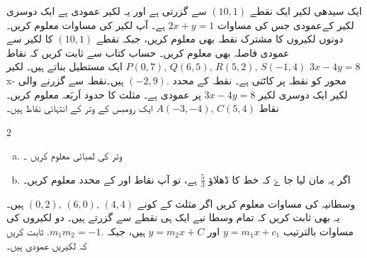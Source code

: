 ایک سیدھی لکیر   ایک نقطے \( (10,1) \)  سے گزرتی ہے اور یہ لکیر عمودی ہے ایک دوسری لکیر  کےعمودی جس کی مساوات \( 2x+y=1 \) ہے۔ آپ لکیر  کی مساوات معلوم کریں۔
دونوں لکیروں کا مشترک نقطہ بھی معلوم کریں، جبکہ نقطے \( (10,1) \)  کا لکیر  سے عمودی فاصلہ بھی معلوم کریں۔
حساب کتاب سے ثابت کریں کہ نقاط \( P(0,7), \, Q(6,5),\, R(5,2), \, S(-1,4) \) ایک مستطیل بناتے ہیں۔
لکیر \( 3x-4y=8 \) x- محور کو نقطہ  پر کاٹتی ہے۔ نقطہ کے محدد    \( (-2,9). \) ہیں۔نقطہ  سے گزرنے والی لکیر ایک دوسری لکیر  \( 3x-4y=8 \) پر عمودی ہے۔ مثلث  کا حدود اَربَعہ معلوم کریں۔
نقاط \( A(-3,-4) , \, C(5,4) \) ایک رومبس  کے وتر کے انتہائی نقاط ہیں۔
\begin{multicols}{2}
\begin{enumerate}[a.]
\item
وتر  کی لمبائی معلوم کریں ۔
\item
اگر یہ مان لیا جا ۓ کہ خط  کا ڈھلاؤ  \( \frac{5}{3} \) ہے، تو آپ نقاط  اور  کے محدد معلوم کریں۔
\end{enumerate}
\end{multicols}
وسطانیہ کی مساوات معلوم کریں اگر مثلث کے کونے \( (0,2), \, (6,0), \, (4,4) \) ہیں۔ یہ بھی ثابت کریں کہ تمام  وسطا نیے ایک ہی نقطے سے گزرتے ہیں۔
دو لکیروں کی مساوات بالترتیب \( y=m_1x +c_1  \) اور  \(y=m_2x + C    \) ہیں، جبکہ \(m_{1}m_{2}=-1. \). ثابت کریں کہ لکیریں عمودی ہیں۔ 

